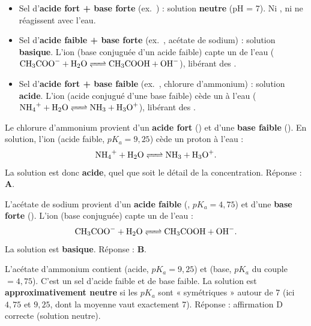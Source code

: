 \documentclass[11pt,a4paper]{article}
\begin{document}
\begin{regle}
\begin{itemize}[leftmargin=1.6em,topsep=2pt,itemsep=2pt]
  \item Sel d'\textbf{acide fort + base forte} (ex.\ ) : solution \textbf{neutre} (pH = 7). Ni
        , ni  ne réagissent avec l'eau.
  \item Sel d'\textbf{acide faible + base forte} (ex.\ , acétate de sodium) : solution
        \textbf{basique}. L'ion  (base conjuguée d'un acide faible) capte un  de l'eau
        ($\ce{CH3COO- + H2O <=> CH3COOH + OH-}$), libérant des .
  \item Sel d'\textbf{acide fort + base faible} (ex.\ , chlorure d'ammonium) : solution
        \textbf{acide}. L'ion  (acide conjugué d'une base faible) cède un  à l'eau
        ($\ce{NH4+ + H2O <=> NH3 + H3O+}$), libérant des .
\end{itemize}
\end{regle}

\begin{exemple}
Le chlorure d'ammonium  provient d'un \textbf{acide fort} () et d'une \textbf{base faible}
(). En solution, l'ion  (acide faible, $pK_a = 9{,}25$) cède un proton à l'eau :
\[ \ce{NH4+ + H2O <=> NH3 + H3O+}. \]
La solution est donc \textbf{acide}, quel que soit le détail de la concentration. Réponse : \textbf{A}.
\end{exemple}

\begin{exemple}
L'acétate de sodium  provient d'un \textbf{acide faible} (, $pK_a = 4{,}75$) et
d'une \textbf{base forte} (). L'ion  (base conjuguée) capte un  de l'eau :
\[ \ce{CH3COO- + H2O <=> CH3COOH + OH-}. \]
La solution est \textbf{basique}. Réponse : \textbf{B}.
\end{exemple}

\begin{exemple}
L'acétate d'ammonium  contient  (acide, $pK_a=9{,}25$) et  (base,
$pK_a$ du couple $=4{,}75$). C'est un sel d'acide faible et de base faible. La solution est
\textbf{approximativement neutre} si les $pK_a$ sont « symétriques » autour de 7 (ici $4{,}75$ et $9{,}25$,
dont la moyenne vaut exactement 7). Réponse : affirmation D correcte (solution neutre).
\end{exemple}
\end{document}
